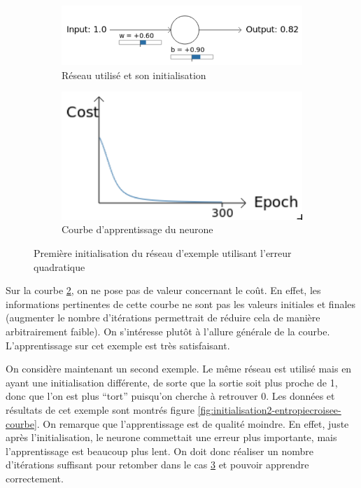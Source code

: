 \begin{figure}[h]
\centering
\begin{subfigure}{.5\textwidth}
  \centering
  \includegraphics[width=.6\linewidth]{img/entropiecroisee_reseau_utilise.png}
  \caption{Réseau utilisé et son initialisation}
  \label{fig:initialisation1-entropiecroisee-schema}
\end{subfigure}%
\begin{subfigure}{.4\textwidth}
  \centering
  \includegraphics[width=.4\linewidth]{img/entropiecroisee_apprentissage1.png}
  \caption{Courbe d'apprentissage du neurone}
  \label{fig:initialisation1-entropiecroisee-courbe}
\end{subfigure}
\caption{Première initialisation du réseau d'exemple utilisant l'erreur quadratique}
\label{fig:initialisation1-entropiecroisee}
\end{figure}


Sur la courbe \ref{fig:initialisation1-entropiecroisee-courbe}, 
on ne pose pas de valeur concernant le coût. En effet, les informations pertinentes de cette courbe ne sont pas les valeurs initiales 
et finales (augmenter le nombre d'itérations permettrait de réduire cela de manière arbitrairement faible). On s'intéresse plutôt à l'allure générale de 
la courbe. L'apprentissage sur cet exemple est très satisfaisant. 

On considère maintenant un second exemple. Le même réseau est utilisé mais en ayant 
une initialisation différente, de sorte que la sortie soit plus proche de 1, donc que l'on est plus ``tort'' puisqu'on cherche à retrouver 0.
Les données et résultats de cet exemple sont montrés figure \ref{fig:initialisation2-entropiecroisee-courbe}.
On remarque que l'apprentissage est de qualité moindre. En effet, juste après l'initialisation, le neurone commettait une erreur plus importante,
mais l'apprentissage est beaucoup plus lent. On doit donc réaliser un nombre d'itérations suffisant pour retomber dans le cas
\ref{fig:initialisation1-entropiecroisee} et pouvoir apprendre correctement.

